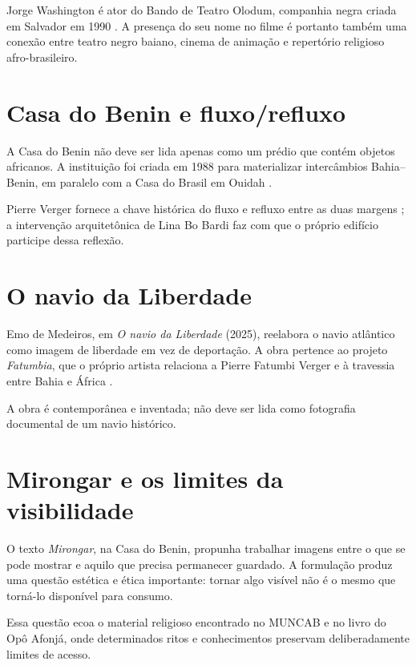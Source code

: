 Jorge Washington é ator do Bando de Teatro
Olodum, companhia negra criada em
Salvador em 1990
\cite{bando-jorge-washington}. A presença do
seu nome no filme
é portanto também uma conexão entre teatro
negro baiano, cinema de animação e
repertório religioso afro-brasileiro.

\section{Casa do Benin e fluxo/refluxo}
\label{section-casa-benin-fluxo-refluxo}
A Casa do Benin não deve ser lida apenas como
um prédio que contém objetos
africanos. A instituição foi criada em 1988
para materializar intercâmbios
Bahia--Benin, em paralelo com a Casa do
Brasil em Ouidah
\cite{casa-benin-visite}.

Pierre Verger fornece a chave histórica do
fluxo e refluxo entre as duas
margens \cite{verger2021fluxo}; a intervenção
arquitetônica de Lina Bo Bardi
faz com que o próprio edifício participe
dessa reflexão.

\section{O navio da Liberdade}
\label{section-navio-liberdade}
Emo de Medeiros, em \emph{O navio da
Liberdade} (2025), reelabora o navio
atlântico como imagem de liberdade em vez de
deportação. A obra pertence ao
projeto \emph{Fatumbia}, que o próprio
artista relaciona a Pierre Fatumbi
Verger e à travessia entre Bahia e África
\cite{emomedeiros-fatumbia}.

A obra é contemporânea e inventada; não deve
ser lida como fotografia
documental de um navio histórico.

\section{Mirongar e os limites da
visibilidade}
\label{section-mirongar-visibilidade}
O texto \emph{Mirongar}, na Casa do Benin,
propunha trabalhar imagens entre o
que se pode mostrar e aquilo que precisa
permanecer guardado. A formulação
produz uma questão estética e ética
importante: tornar algo visível não é o
mesmo que torná-lo disponível para consumo.

Essa questão ecoa o material religioso
encontrado no MUNCAB e no livro do Opô
Afonjá, onde determinados ritos e
conhecimentos preservam deliberadamente
limites de acesso.





